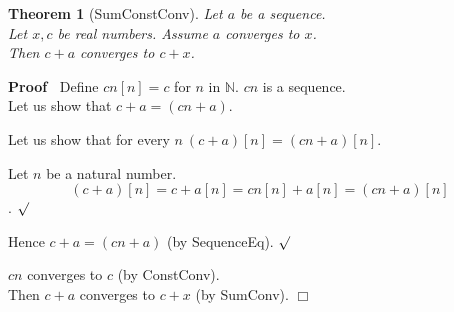 \documentclass{article}
\newenvironment{forthel}{\begin{leftbar}}{\end{leftbar}}
\newenvironment{proof}{\noindent\textbf{Proof\ }}{\hspace*{\fill}$\Box$\medskip}
\newenvironment{subproof}{\begin{list}{}{}
		\item[\text{Proof}]}{\hfill $\surd$ \end{list}}
\newtheorem{theorem}{Theorem}
\newcommand{\NN}{\mathbb{N}}
\newcommand{\plusone}{+}
\newcommand{\plustwo}{+}
\newcommand{\dotequal}{=}
\begin{document}
\begin{forthel}
	\begin{theorem}[SumConstConv]
	Let $a$ be a sequence. \\Let $x,c$ be real numbers. Assume $a$ converges to $x$.
	\\Then $c \plustwo a$ converges to $c + x$.
	\end{theorem}
	\begin{proof}
	Define $cn[n] = c$ for $n$ in $\NN$.
	$cn$ is a sequence.
	\\Let us show that $c \plustwo a = (cn \plusone a)$.
	\begin{subproof}
	Let us show that for every $n \ (c \plustwo a)[n] = (cn \plusone a)[n]$.
	\begin{subproof}
	Let $n$ be a natural number.
	$$(c \plustwo a)[n] \dotequal c + a[n]
	\dotequal cn[n] + a[n]
	\dotequal (cn \plusone a)[n]$$.
	\end{subproof}
	Hence $c \plustwo a = (cn \plusone a)$ (by SequenceEq).
	\end{subproof}
	$cn$ converges to $c$ (by ConstConv).
	\\Then $c \plustwo a$ converges to $c + x$ (by SumConv).
	\end{proof}
	

\end{forthel}
\end{document}
